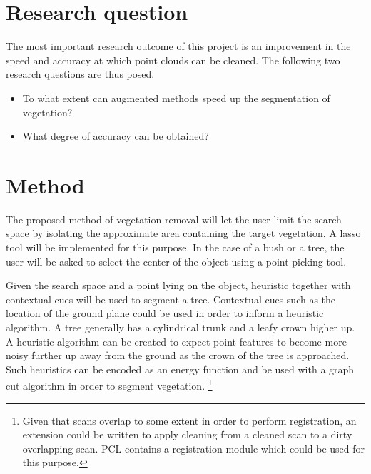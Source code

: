 \documentclass[10pt,twocolumn]{article}
\begin{document}


\section{Research question}

The most important research outcome of this project is an improvement in the speed and accuracy at which point clouds can be cleaned. The following two research questions are thus posed.

\begin{itemize}
\item To what extent can augmented methods speed up the segmentation of vegetation?
\item What degree of accuracy can be obtained?
\end{itemize}

\section{Method}
The proposed method of vegetation removal will let the user limit the search space by isolating the approximate area containing the target vegetation. A lasso tool will be implemented for this purpose. In the case of a bush or a tree, the user will be asked to select the center of the object using a point picking tool. 

Given the search space and a point lying on the object, heuristic together with contextual cues will be used to segment a tree. Contextual cues such as the location of the ground plane could be used in order to inform a heuristic algorithm. A tree generally has a cylindrical trunk and a leafy crown higher up. A heuristic algorithm can be created to expect point features to become more noisy further up away from the ground as the crown of the tree is approached. Such heuristics can be encoded as an energy function and be used with a graph cut algorithm in order to segment vegetation. \footnote{Given that scans overlap to some extent in order to perform registration, an extension could be written to apply cleaning from a cleaned scan to a dirty overlapping scan. PCL contains a registration module which could be used for this purpose.}
\end{document}
